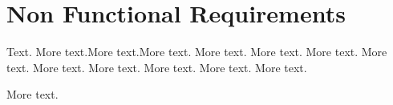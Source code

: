 \section{Non Functional Requirements}

\begin{description}[leftmargin=8em,style=nextline]
  \item[Something] Text. More text.More text.More text. More text. More text. More text. More text. More text. More text. More text. More text. More text. 
  \item[Ought else] More text.
\end{description}
